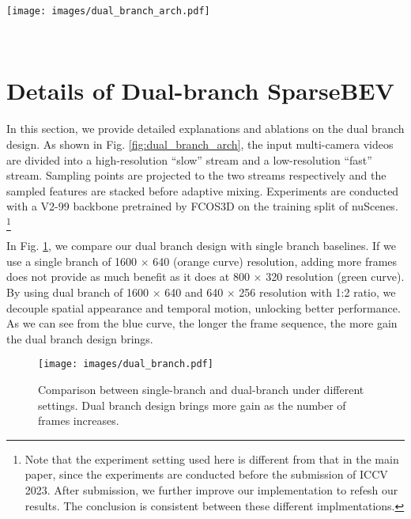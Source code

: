 \documentclass[10pt,twocolumn,letterpaper]{article}
\begin{document}
{\small


}

\begin{figure*}[t]
  \centering
  \texttt{[image: images/dual\_branch\_arch.pdf]}
  \vspace{-10pt}
  \caption{Architecture of dual-branch SparseBEV. The input multi-camera videos are divided into a high-resolution ``slow'' stream and a low-resolution ``fast'' stream.}
  \label{fig:dual_branch_arch}
\end{figure*}

\newpage
~
\newpage

\appendix

\section{Details of Dual-branch SparseBEV}

In this section, we provide detailed explanations and ablations on the dual branch design. As shown in Fig. \ref{fig:dual_branch_arch}, the input multi-camera videos are divided into a high-resolution ``slow'' stream and a low-resolution ``fast'' stream. Sampling points are projected to the two streams respectively and the sampled features are stacked before adaptive mixing. Experiments are conducted with a V2-99 backbone pretrained by FCOS3D \cite{fcos3d} on the training split of nuScenes. \footnote{Note that the experiment setting used here is different from that in the main paper, since the experiments are conducted before the submission of ICCV 2023. After submission, we further improve our implementation to refesh our results. The conclusion is consistent between these different implmentations.}

In Fig. \ref{fig:dual_branch}, we compare our dual branch design with single branch baselines. If we use a single branch of 1600 $\times$ 640 (orange curve) resolution, adding more frames does not provide as much benefit as it does at 800 $\times$ 320 resolution (green curve). By using dual branch of 1600 $\times$ 640 and 640 $\times$ 256 resolution with 1:2 ratio, we decouple spatial appearance and temporal motion, unlocking better performance. As we can see from the blue curve, the longer the frame sequence, the more gain the dual branch design brings.

\begin{figure}[t]
  \centering
  \texttt{[image: images/dual\_branch.pdf]}
  \vspace{-20pt}
  \caption{Comparison between single-branch and dual-branch under different settings. Dual branch design brings more gain as the number of frames increases.}
  \label{fig:dual_branch}
\end{figure}
\end{document}
